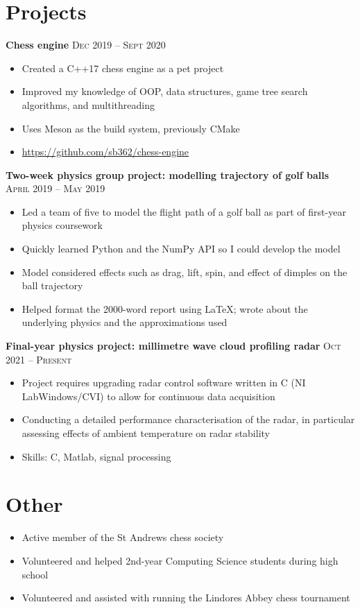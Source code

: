 \documentclass{article}
\begin{document}
	\section*{Projects}
		\textbf{Chess engine} \hfill \textsc{Dec 2019 -- Sept 2020}
		\begin{itemize}
			\item Created a C++17 chess engine as a pet project
			\item Improved my knowledge of OOP, data structures, game tree search algorithms, and multithreading
			\item Uses Meson as the build system, previously CMake
			\item \url{https://github.com/sb362/chess-engine}
		\end{itemize}
		\bigskip
		\textbf{Two-week physics group project: modelling trajectory of golf balls} \hfill \textsc{April 2019 -- May 2019}
		\begin{itemize}
			\item Led a team of five to model the flight path of a golf ball as part of first-year physics coursework
			\item Quickly learned Python and the NumPy API so I could develop the model
			\item Model considered effects such as drag, lift, spin, and effect of dimples on the ball trajectory
			\item Helped format the 2000-word report using \LaTeX ; wrote about the underlying physics and the approximations used
		\end{itemize}
		\bigskip
		\textbf{Final-year physics project: millimetre wave cloud profiling radar} \hfill \textsc{Oct 2021 -- Present}
		\begin{itemize}
			\item Project requires upgrading radar control software written in C (NI LabWindows/CVI) to allow for continuous data acquisition
			\item Conducting a detailed performance characterisation of the radar, in particular assessing effects of ambient temperature on radar stability
			\item Skills: C, Matlab, signal processing
		\end{itemize}
	
	\section*{Other}
		\begin{itemize}
			\item Active member of the St Andrews chess society
			\item Volunteered and helped 2nd-year Computing Science students during high school
			\item Volunteered and assisted with running the Lindores Abbey chess tournament
		\end{itemize}
	
\end{document}
